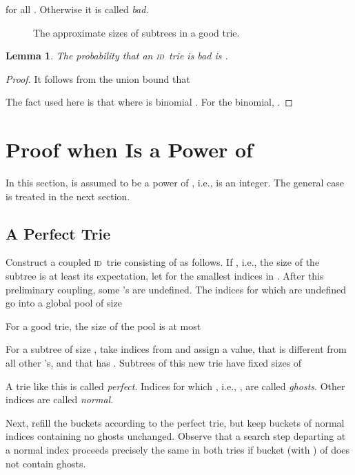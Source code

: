\documentclass{article}
\newcommand{\id}{{\scshape id}}
\newtheorem{lemma}{Lemma}
\begin{document}
for all . Otherwise it is called \emph{bad}.

\begin{figure}
\caption[]{The approximate sizes of subtrees in a good trie.}
\label{fig:tree}
\end{figure}

\begin{lemma}
    \label{lem:pleasant}
    The probability that an \id\ trie is bad is .
\end{lemma}

\begin{proof}
    It follows from the union bound that
    
    The fact used here is that  where
     is binomial .
For the binomial, .
\end{proof}

\section{Proof when  Is a Power of }

In this section,  is assumed to be a power of , i.e.,  is an integer.
The general case is treated in the next section.

\subsection{A Perfect Trie}

\label{sec:perfect}

Construct a coupled \id\ trie consisting of  as follows. If
, i.e., the size of the subtree  is at least its
expectation, let  for the  smallest indices in .
After this preliminary coupling, some 's are undefined. The indices 
for which  are undefined go into a global pool  of size

For a good trie, the size of the pool is at most


For a subtree  of size , take  indices  from
 and assign  a value, that is different from all other 's, and
that has .  Subtrees of this new trie have fixed
sizes of

A trie like this is called \emph{perfect}.  Indices  for which , i.e., , are called \emph{ghosts}. Other indices are
called \emph{normal}.

Next, refill the buckets according to the perfect trie, but keep buckets of normal
indices containing no ghosts unchanged.  Observe that a search step departing
at a normal index  proceeds precisely the same in both tries if bucket 
(with ) of  does not contain ghosts.  
\end{document}

